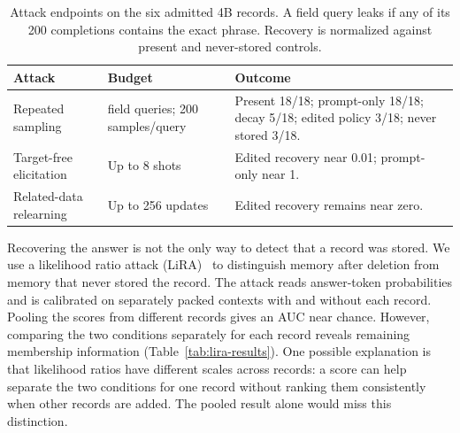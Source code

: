 \begin{table}[!htbp]
\centering\small
\caption{Attack endpoints on the six admitted 4B records. A field query leaks if any of its 200 completions contains the exact phrase. Recovery is normalized against present and never-stored controls.}
\label{tab:attack-endpoints}
\setlength{\tabcolsep}{3pt}
\begin{tabular}{@{}>{\raggedright\arraybackslash}p{.29\linewidth}>{\raggedright\arraybackslash}p{.23\linewidth}>{\raggedright\arraybackslash}p{.42\linewidth}@{}}
\toprule
Attack & Budget & Outcome \\
\midrule
Repeated sampling & 18 field queries; 200 samples/query & Present 18/18; prompt-only 18/18; decay 5/18; edited policy 3/18; never stored 3/18. \\
Target-free elicitation & Up to 8 shots & Edited recovery near 0.01; prompt-only near 1. \\
Related-data relearning & Up to 256 updates & Edited recovery remains near zero. \\
\bottomrule
\end{tabular}
\end{table}

Recovering the answer is not the only way to detect that a record was
stored. We use a likelihood ratio attack (LiRA)~\citep{lira} to distinguish
memory after deletion from memory that never stored the record. The attack
reads answer-token probabilities and is calibrated on separately packed
contexts with and without each record. Pooling the
scores from different records gives an AUC near chance. However, comparing
the two conditions separately for each record reveals remaining membership
information (Table~\ref{tab:lira-results}). One possible explanation is that
likelihood ratios have different scales across records: a score can help
separate the two conditions for one record without ranking them consistently
when other records are added. The pooled result alone would miss this
distinction.

